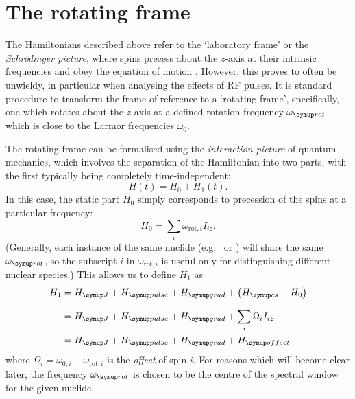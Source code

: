 \section{The rotating frame}
\label{sec:theory__rotating_frame}

The Hamiltonians described above refer to the `laboratory frame' or the \textit{Schr\"odinger picture}, where spins precess about the $z$-axis at their intrinsic frequencies and obey the equation of motion .
However, this proves to often be unwieldy, in particular when analysing the effects of RF pulses.
It is standard procedure to transform the frame of reference to a `rotating frame', specifically, one which rotates about the $z$-axis at a defined rotation frequency $\omegarot$ which is close to the Larmor frequencies $\omega_0$.

The rotating frame can be formalised using the \textit{interaction picture} of quantum mechanics,\autocite{Sakurai2021} which involves the separation of the Hamiltonian into two parts, with the first typically being completely time-independent:
\begin{equation}
    \label{eq:interaction_ham}
    H(t) = H_0 + H_1(t).
\end{equation}
In this case, the static part $H_0$ simply corresponds to precession of the spins at a particular frequency:
\begin{equation}
    \label{eq:interaction_ham0}
    H_0 = \sum_i \omega_{\text{rot},i}I_{iz}.
\end{equation}
(Generally, each instance of the same nuclide (e.g.\ \proton{} or \carbon{}) will share the same $\omegarot$, so the subscript $i$ in $\omega_{\text{rot},i}$ is useful only for distinguishing different nuclear species.)
This allows us to define $H_1$ as
\begin{align}
    \label{eq:reduced_ham}
    H_1 &= \HJ + \Hpulse + \Hgrad + \left(\Hcs - H_0\right) \\[7pt] \notag
        &= \HJ + \Hpulse + \Hgrad + \sum_i \Omega_i I_{iz} \\ \notag
        &= \HJ + \Hpulse + \Hgrad + \Hoffset
\end{align}
where $\Omega_i = \omega_{0,i} - \omega_{\text{rot},i}$ is the \textit{offset} of spin $i$.
For reasons which will become clear later, the frequency $\omegarot$ is chosen to be the centre of the spectral window for the given nuclide.

